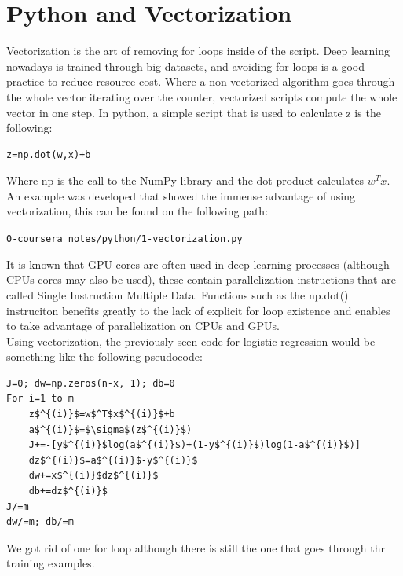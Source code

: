 \documentclass[11pt]{report}
\begin{document}
\section{Python and Vectorization}
Vectorization is the art of removing for loops inside of the script. Deep learning nowadays is trained through big datasets, and avoiding for loops is a good practice to reduce resource cost. Where a non-vectorized algorithm goes through the whole vector iterating over the counter, vectorized scripts compute the whole vector in one step. In python, a simple script that is used to calculate z is the following:
\begin{lstlisting}[mathescape=true]
z=np.dot(w,x)+b
\end{lstlisting}
Where np is the call to the NumPy library and the dot product calculates $w^Tx$. An example was developed that showed the immense advantage of using vectorization, this can be found on the following path:
\begin{center}\texttt{0-coursera\_notes/python/1-vectorization.py}
\end{center}
It is known that GPU cores are often used in deep learning processes (although CPUs cores may also be used), these contain parallelization instructions that are called Single Instruction Multiple Data. Functions such as the np.dot() instruciton benefits greatly to the lack of explicit for loop existence and enables to take advantage of parallelization on CPUs and GPUs.\\
Using vectorization, the previously seen code for logistic regression would be something like the following pseudocode:
\begin{lstlisting}[mathescape=true]
J=0; dw=np.zeros(n-x, 1); db=0
For i=1 to m
    z$^{(i)}$=w$^T$x$^{(i)}$+b
    a$^{(i)}$=$\sigma$(z$^{(i)}$)
    J+=-[y$^{(i)}$log(a$^{(i)}$)+(1-y$^{(i)}$)log(1-a$^{(i)}$)]
    dz$^{(i)}$=a$^{(i)}$-y$^{(i)}$
    dw+=x$^{(i)}$dz$^{(i)}$
    db+=dz$^{(i)}$
J/=m
dw/=m; db/=m
\end{lstlisting}
We got rid of one for loop although there is still the one that goes through thr training examples.
\end{document}
